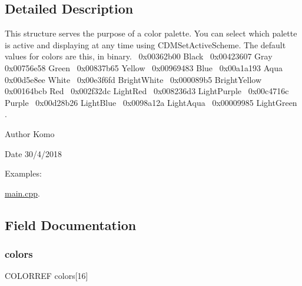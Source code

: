 \subsection{Detailed Description}
This structure serves the purpose of a color palette. You can select which palette is active and displaying at any time using C\+D\+M\+Set\+Active\+Scheme. The default values for colors are this, in binary.~\newline
 0x00362b00 Black~\newline
 0x00423607 Gray~\newline
 0x00756e58 Green~\newline
 0x00837b65 Yellow~\newline
 0x00969483 Blue~\newline
 0x00a1a193 Aqua~\newline
 0x00d5e8ee White~\newline
 0x00e3f6fd Bright\+White~\newline
 0x000089b5 Bright\+Yellow~\newline
 0x00164bcb Red~\newline
 0x002f32dc Light\+Red~\newline
 0x008236d3 Light\+Purple~\newline
 0x00c4716c Purple~\newline
 0x00d28b26 Light\+Blue~\newline
 0x0098a12a Light\+Aqua~\newline
 0x00009985 Light\+Green~\newline
. 

\begin{DoxyAuthor}{Author}
Komo 
\end{DoxyAuthor}
\begin{DoxyDate}{Date}
30/4/2018 
\end{DoxyDate}
\begin{Desc}
\item[Examples\+: ]\par
\mbox{\hyperlink{main_8cpp-example}{main.\+cpp}}.\end{Desc}


\subsection{Field Documentation}
\mbox{\label{struct_c_d_m_color_scheme_a5b8477f088551d8fc001899358e29a43}} 
\subsubsection{\texorpdfstring{colors}{colors}}
{\footnotesize\ttfamily C\+O\+L\+O\+R\+R\+EF colors\mbox{[}16\mbox{]}}

